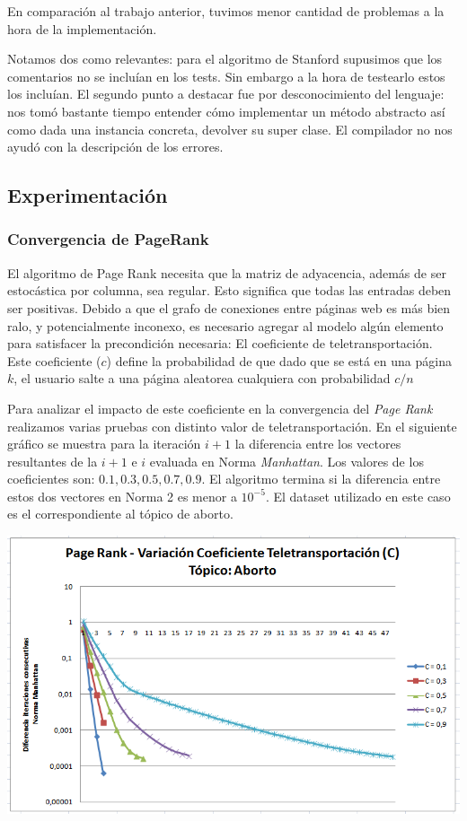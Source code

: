 	En comparación al trabajo anterior, tuvimos menor cantidad de problemas a la hora de la implementación. 

	Notamos dos como relevantes: para el algoritmo de Stanford supusimos que los comentarios no se incluían en los tests. Sin embargo a la hora de testearlo estos los incluían. El segundo punto a destacar fue por desconocimiento del lenguaje: nos tomó bastante tiempo entender cómo implementar un método abstracto así como dada una instancia concreta, devolver su super clase. El compilador no nos ayudó con la descripción de los errores.

\subsection{Experimentación}
\subsubsection{Convergencia de PageRank}
	
	El algoritmo de Page Rank necesita que la matriz de adyacencia, además de ser estocástica por columna, sea regular. Esto significa que todas las entradas deben ser positivas. Debido a que el grafo de conexiones entre páginas web es más bien ralo, y potencialmente inconexo, es necesario agregar al modelo algún elemento para satisfacer la precondición necesaria: El coeficiente de teletransportación. Este coeficiente ($c$) define la probabilidad de que dado que se está en una página $k$, el usuario salte a una página aleatorea cualquiera con probabilidad $c/n$

	Para analizar el impacto de este coeficiente en la convergencia del \textit{Page Rank} realizamos varias pruebas con distinto valor de teletransportación. En el siguiente gráfico se muestra para la iteración $i+1$ la diferencia entre los vectores resultantes de la $i+1$ e $i$ evaluada en Norma \textit{Manhattan}. Los valores de los coeficientes son: $0.1, 0.3, 0.5, 0.7, 0.9$. El algoritmo termina si la diferencia entre estos dos vectores en Norma 2 es menor a $10^{-5}$. El dataset utilizado en este caso es el correspondiente al tópico de aborto.

	\par 
	\begin{center}
		\includegraphics[scale=0.6]{./img/page_rank_variacion_coef_teletransportacion.png}
	\end{center}
	\par 


